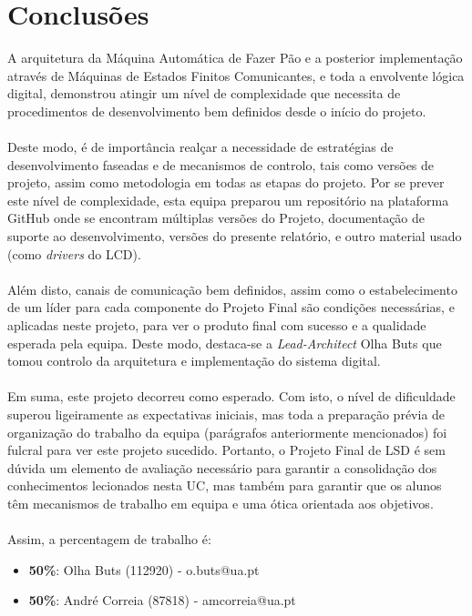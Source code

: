 \documentclass{report}
\begin{document}
\chapter{Conclusões}
\label{chap.conclusao}
A arquitetura da Máquina Automática de Fazer Pão e a posterior implementação através de Máquinas de Estados Finitos Comunicantes, e toda a envolvente lógica digital, demonstrou atingir um nível de complexidade que necessita de procedimentos de desenvolvimento bem definidos desde o início do projeto.
\\\\
Deste modo, é de importância realçar a necessidade de estratégias de desenvolvimento faseadas e de mecanismos de controlo, tais como versões de projeto, assim como metodologia em todas as etapas do projeto. Por se prever este nível de complexidade, esta equipa preparou um repositório na plataforma GitHub onde se encontram múltiplas versões do Projeto, documentação de suporte ao desenvolvimento, versões do presente relatório, e outro material usado (como \textit{drivers} do LCD).
\\\\
Além disto, canais de comunicação bem definidos, assim como o estabelecimento de um líder para cada componente do Projeto Final são condições necessárias, e aplicadas neste projeto, para ver o produto final com sucesso e a qualidade esperada pela equipa. Deste modo, destaca-se a \textit{Lead-Architect} Olha Buts que tomou controlo da arquitetura e implementação do sistema digital.
\\\\
Em suma, este projeto decorreu como esperado. Com isto, o nível de dificuldade superou ligeiramente as expectativas iniciais, mas toda a preparação prévia de organização do trabalho da equipa (parágrafos anteriormente mencionados) foi fulcral para ver este projeto sucedido. Portanto, o Projeto Final de LSD é sem dúvida um elemento de avaliação necessário para garantir a consolidação dos conhecimentos lecionados nesta UC, mas também para garantir que os alunos têm mecanismos de trabalho em equipa e uma ótica orientada aos objetivos.
\\\\
Assim, a percentagem de trabalho é:
\begin{itemize}
	\item \textbf{50\%}: Olha Buts (112920) - o.buts@ua.pt
	\item \textbf{50\%}: André Correia (87818) - amcorreia@ua.pt
\end{itemize}
\end{document}
